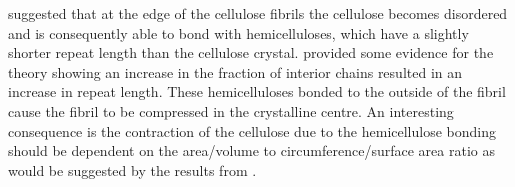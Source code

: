 \cite{walker2006primary} suggested that at the edge of the cellulose fibrils the cellulose becomes
disordered and is consequently able to bond with hemicelluloses, which have a
slightly shorter repeat length than the cellulose crystal. \cite{Davidson_2004} provided some evidence for the theory showing an increase in the fraction of interior chains resulted in an increase in repeat length. These hemicelluloses bonded to the outside of the fibril cause the fibril to be compressed in the
crystalline centre. An interesting consequence
is the contraction of the cellulose due to the hemicellulose bonding should be
dependent on the area/volume to circumference/surface area ratio as would be suggested by the results from \cite{Davidson_2004}.